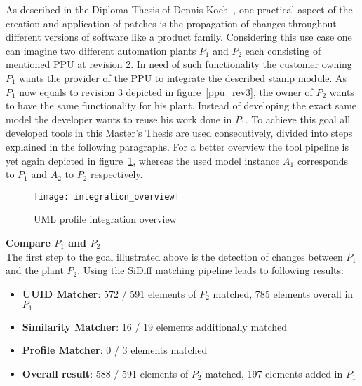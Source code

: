 As described in the Diploma Thesis of Dennis Koch~\cite{kochThesis}, one
practical aspect of the creation and application of patches is the propagation
of changes throughout different versions of software like a product family.
Considering this use case one can imagine two different automation plants $P_1$ and
$P_2$ each consisting of mentioned \ac{PPU} at revision 2. In need of such
functionality the customer owning $P_1$ wants the provider of the
\ac{PPU} to integrate the described stamp module. As $P_1$ now equals to
revision 3 depicted in figure~\ref{ppu_rev3}, the owner of $P_2$ wants to
have the same functionality for his plant. Instead of developing the exact same
model the developer wants to reuse his work done in $P_1$. To achieve this goal
all developed tools in this Master's Thesis are used consecutively, divided into
steps explained in the following paragraphs. For a better overview the tool
pipeline is yet again depicted in figure~\ref{integration_overview2}, whereas
the used model instance $A_1$ corresponds to $P_1$ and $A_2$ to $P_2$
respectively.

\begin{figure}[h!]
\begin{center}
\texttt{[image: integration\_overview]}\\
\end{center}
\caption{UML profile integration overview}
\label{integration_overview2}
\end{figure}

\textbf{Compare $P_1$ and $P_2$} \\
The first step to the goal illustrated above is the detection of changes
between $P_1$ and the plant $P_2$. Using the SiDiff matching pipeline leads to
following results:
\begin{itemize}
  \item \textbf{\ac{UUID} Matcher}: 572 / 591 elements of $P_2$ matched, 785
  elements overall in $P_1$
  \item \textbf{Similarity Matcher}: 16 / 19 elements additionally matched
  \item \textbf{Profile Matcher}: 0 / 3 elements matched
  \item \textbf{Overall result}: 588 / 591 elements of $P_2$ matched, 197
  elements added in $P_1$
\end{itemize}

